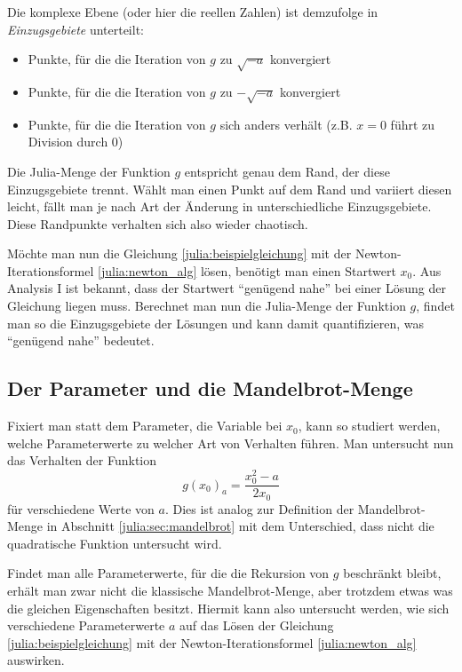 Die komplexe Ebene (oder hier die reellen Zahlen) ist demzufolge in \emph{Einzugsgebiete} unterteilt:
%
\begin{itemize}
    \item Punkte, für die die Iteration von $g$ zu $\!\sqrt{-a}$ konvergiert
    \item Punkte, für die die Iteration von $g$ zu $-\!\sqrt{-a}$ konvergiert
    \item Punkte, für die die Iteration von $g$ sich anders verhält (z.B. $x = 0$ führt zu Division durch $0$)
\end{itemize}
Die Julia-Menge der Funktion $g$ entspricht genau dem Rand, der diese Einzugsgebiete trennt.
Wählt man einen Punkt auf dem Rand und variiert diesen leicht, fällt man je nach Art der Änderung in unterschiedliche Einzugsgebiete.
Diese Randpunkte verhalten sich also wieder chaotisch.

Möchte man nun die Gleichung \eqref{julia:beispielgleichung} mit der Newton-Iterationsformel \eqref{julia:newton_alg} lösen, benötigt man einen Startwert $x_0$.
Aus Analysis I ist bekannt, dass der Startwert ``genügend nahe'' bei einer Lösung der Gleichung liegen muss.
Berechnet man nun die Julia-Menge der Funktion $g$, findet man so die Einzugsgebiete der Lösungen und kann damit quantifizieren, was ``genügend nahe'' bedeutet.

\subsection{Der Parameter und die Mandelbrot-Menge}
Fixiert man statt dem Parameter, die Variable bei $x_0$, kann so studiert werden, welche Parameterwerte zu welcher Art von Verhalten führen.
Man untersucht nun das Verhalten der Funktion
\begin{equation*}
    g(x_0)_a = \frac{x_0^2 - a}{2x_0}
\end{equation*}
für verschiedene Werte von $a$.
Dies ist analog zur Definition der Mandelbrot-Menge in Abschnitt \ref{julia:sec:mandelbrot} mit dem Unterschied, dass nicht die quadratische Funktion untersucht wird.

Findet man alle Parameterwerte, für die die Rekursion von $g$ beschränkt bleibt, erhält man zwar nicht die klassische Mandelbrot-Menge, aber trotzdem etwas was die gleichen Eigenschaften besitzt.
Hiermit kann also untersucht werden, wie sich verschiedene Parameterwerte $a$ auf das Lösen der Gleichung \eqref{julia:beispielgleichung} mit der Newton-Iterationsformel \eqref{julia:newton_alg} auswirken.
